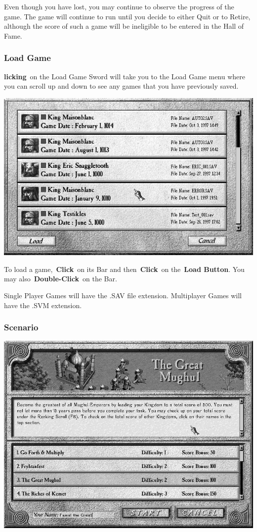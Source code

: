 Even though you have lost, you may continue to observe the progress of the game. The game will continue to run until you decide to either Quit or to Retire, although the score of such a game will be ineligible to be entered in the Hall of Fame.

\subsubsection{Load Game}


\textbf{licking} on the Load Game Sword will take you to the Load Game menu where you can scroll up and down to see any games that you have previously saved.

\begin{center}
	\includegraphics[width=0.7\linewidth]{Iload}
\end{center}

To load a game, \textbf{Click} on its Bar and then \textbf{Click} on the \textbf{Load Button}. You may also \textbf{Double-Click} on the Bar.

Single Player Games will have the .SAV file extension. Multiplayer Games will have the .SVM extension.

\subsubsection{Scenario}


\begin{center}
	\includegraphics[width=0.7\linewidth]{Iscenario}
\end{center}

